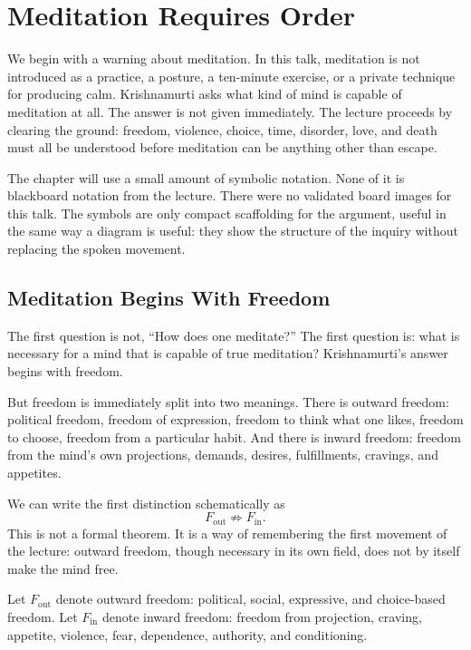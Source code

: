 \chapter{Meditation Requires Order}

We begin with a warning about meditation. In this talk, meditation is not introduced as a practice, a posture, a ten-minute exercise, or a private technique for producing calm. Krishnamurti asks what kind of mind is capable of meditation at all. The answer is not given immediately. The lecture proceeds by clearing the ground: freedom, violence, choice, time, disorder, love, and death must all be understood before meditation can be anything other than escape.

The chapter will use a small amount of symbolic notation. None of it is blackboard notation from the lecture. There were no validated board images for this talk. The symbols are only compact scaffolding for the argument, useful in the same way a diagram is useful: they show the structure of the inquiry without replacing the spoken movement.

\section{Meditation Begins With Freedom}

The first question is not, ``How does one meditate?'' The first question is: what is necessary for a mind that is capable of true meditation? Krishnamurti's answer begins with freedom.

But freedom is immediately split into two meanings. There is outward freedom: political freedom, freedom of expression, freedom to think what one likes, freedom to choose, freedom from a particular habit. And there is inward freedom: freedom from the mind's own projections, demands, desires, fulfillments, cravings, and appetites.

We can write the first distinction schematically as
\begin{equation}
F_{\mathrm{out}} \not\Rightarrow F_{\mathrm{in}} .
\end{equation}
This is not a formal theorem. It is a way of remembering the first movement of the lecture: outward freedom, though necessary in its own field, does not by itself make the mind free.

\begin{definition}
Let \(F_{\mathrm{out}}\) denote outward freedom: political, social, expressive, and choice-based freedom. Let \(F_{\mathrm{in}}\) denote inward freedom: freedom from projection, craving, appetite, violence, fear, dependence, authority, and conditioning.
\end{definition}

